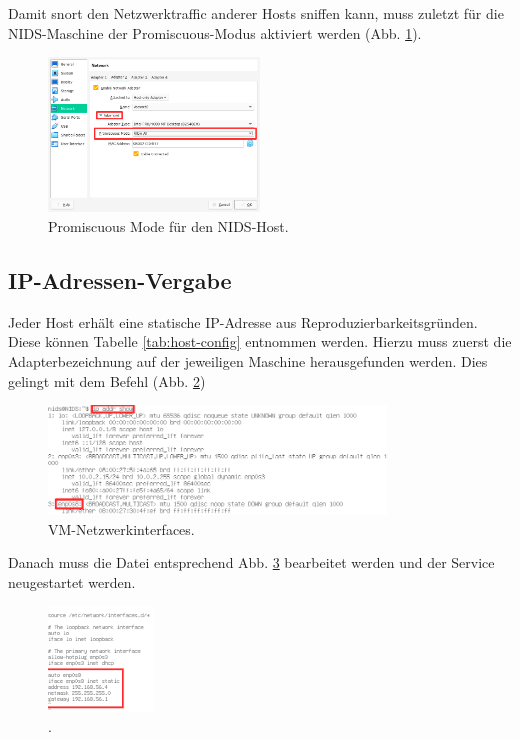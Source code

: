 Damit snort den Netzwerktraffic anderer Hosts sniffen kann, muss zuletzt für die NIDS-Maschine der Promiscuous-Modus aktiviert werden (Abb. \ref{fig:promisc}).

\begin{figure}[H]
  \centering
  \includegraphics[width=0.5\textwidth]{graphics/setup/promisc.png}
  \caption{Promiscuous Mode für den NIDS-Host.}\label{fig:promisc}
\end{figure}


\subsection{IP-Adressen-Vergabe}\label{sec:ip-dist}
Jeder Host erhält eine statische IP-Adresse aus Reproduzierbarkeitsgründen. Diese können Tabelle \ref{tab:host-config} entnommen werden. Hierzu muss zuerst die Adapterbezeichnung auf der jeweiligen Maschine herausgefunden werden. Dies gelingt mit dem Befehl  (Abb. \ref{fig:ip-addr-show})

\begin{figure}[H]
  \centering
  \includegraphics[width=0.8\textwidth]{graphics/setup/static-ip-1.png}
  \caption{VM-Netzwerkinterfaces.}\label{fig:ip-addr-show}
\end{figure}

Danach muss die Datei  entsprechend Abb. \ref{fig:static-ip-1} bearbeitet werden und der  Service neugestartet werden.

\begin{figure}[H]
  \centering
  \includegraphics[width=0.25\textwidth]{graphics/setup/static-ip-2.png}
  \caption{.}\label{fig:static-ip-1}
\end{figure}


